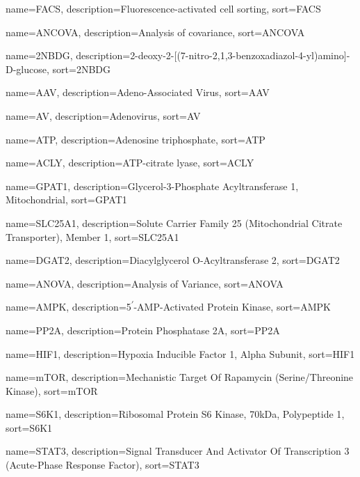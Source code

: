 
{
  name=FACS,
  description={Fluorescence-activated cell sorting},
  sort=FACS
}

{
  name=ANCOVA,
  description={Analysis of covariance},
  sort=ANCOVA
}

{
  name=2NBDG,
  description={2-deoxy-2-[(7-nitro-2,1,3-benzoxadiazol-4-yl)amino]-D-glucose},
  sort=2NBDG
}

{
  name=AAV,
  description={Adeno-Associated Virus},
  sort=AAV
}


{
  name=AV,
  description={Adenovirus},
  sort=AV
}

{
  name=ATP,
  description={Adenosine triphosphate},
  sort=ATP
}

{
  name=ACLY,
  description={ATP-citrate lyase},
  sort=ACLY
}

{
  name=GPAT1,
  description={Glycerol-3-Phosphate Acyltransferase 1, Mitochondrial},
  sort=GPAT1
}

{
  name=SLC25A1,
  description={Solute Carrier Family 25 (Mitochondrial Citrate Transporter), Member 1},
  sort=SLC25A1
}

{
  name=DGAT2,
  description={Diacylglycerol O-Acyltransferase 2},
  sort=DGAT2
}


{
  name=ANOVA,
  description={Analysis of Variance},
  sort=ANOVA
}

{
  name=AMPK,
  description={5\textsuperscript{$\prime$}-AMP-Activated Protein Kinase},
  sort=AMPK
}

{
  name=PP2A,
  description={Protein Phosphatase 2A},
  sort=PP2A
}

{
  name=HIF1{\textalpha},
  description={Hypoxia Inducible Factor 1, Alpha Subunit},
  sort=HIF1{\textalpha}
}

{
  name=mTOR,
  description={Mechanistic Target Of Rapamycin (Serine/Threonine Kinase)},
  sort=mTOR
}

{
  name=S6K1,
  description={Ribosomal Protein S6 Kinase, 70kDa, Polypeptide 1},
  sort=S6K1
}

{
  name=STAT3,
  description={Signal Transducer And Activator Of Transcription 3 (Acute-Phase Response Factor)},
  sort=STAT3
}

